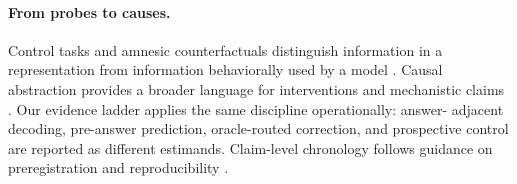 \paragraph{From probes to causes.}
Control tasks and amnesic counterfactuals distinguish information in a representation from
information behaviorally used by a model \citep{hewitt2019control,elazar2021amnesic}. Causal
abstraction provides a broader language for interventions and mechanistic claims
\citep{geiger2025causal}. Our evidence ladder applies the same discipline operationally: answer-
adjacent decoding, pre-answer prediction, oracle-routed correction, and prospective control are
reported as different estimands. Claim-level chronology follows guidance on preregistration and
reproducibility \citep{vanmiltenburg2021preregistering,pineau2021reproducibility}.
